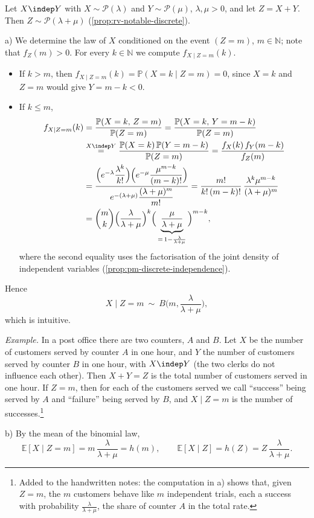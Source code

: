 \begin{example}\label{exa:ce-poisson}
Let $X\indep Y$ with $X\sim\mathcal P(\lambda)$ and $Y\sim\mathcal P(\mu)$, $\lambda,\mu>0$, and
let $Z=X+Y$. Then $Z\sim\mathcal P(\lambda+\mu)$ (\cref{prop:rv-notable-discrete}).

a) We determine the law of $X$ conditioned on the event $(Z=m)$, $m\in\mathbb N$; note that
$f_Z(m)>0$. For every $k\in\mathbb N$ we compute $f_{X\mid Z=m}(k)$.
\begin{itemize}
  \item If $k>m$, then $f_{X\mid Z=m}(k)=\mathbb P(X=k\mid Z=m)=0$, since $X=k$ and $Z=m$ would
    give $Y=m-k<0$.
  \item If $k\le m$,
    \[
    \begin{aligned}
      f_{X\mid Z=m}(k)&=\frac{\mathbb P(X=k,\,Z=m)}{\mathbb P(Z=m)}=\frac{\mathbb P(X=k,\,Y=m-k)}{\mathbb P(Z=m)}\\
      &\overset{X\indep Y}{=}\frac{\mathbb P(X=k)\,\mathbb P(Y=m-k)}{\mathbb P(Z=m)}
      =\frac{f_X(k)\,f_Y(m-k)}{f_Z(m)}\\
      &=\frac{\Big(e^{-\lambda}\dfrac{\lambda^k}{k!}\Big)\Big(e^{-\mu}\dfrac{\mu^{m-k}}{(m-k)!}\Big)}
        {e^{-(\lambda+\mu)}\dfrac{(\lambda+\mu)^m}{m!}}
      =\frac{m!}{k!\,(m-k)!}\,\frac{\lambda^k\mu^{m-k}}{(\lambda+\mu)^m}\\
      &=\binom mk\Big(\frac\lambda{\lambda+\mu}\Big)^k\Big(\underbrace{\frac\mu{\lambda+\mu}}_{=\,1-\frac\lambda{\lambda+\mu}}\Big)^{m-k},
    \end{aligned}
    \]
    where the second equality uses the factorisation of the joint density of independent
    variables (\cref{prop:pm-discrete-independence}).
\end{itemize}
Hence
\[
  X\mid Z=m\ \sim\ B\Big(m,\frac\lambda{\lambda+\mu}\Big),
\]
which is intuitive.

\emph{Example.} In a post office there are two counters, $A$ and $B$. Let $X$ be the number of
customers served by counter $A$ in one hour, and $Y$ the number of customers served by counter
$B$ in one hour, with $X\indep Y$ (the two clerks do not influence each other). Then $X+Y=Z$ is
the total number of customers served in one hour. If $Z=m$, then for each of the customers
served we call ``success'' being served by $A$ and ``failure'' being served by $B$, and
$X\mid Z=m$ is the number of successes.\footnote{Added to the handwritten notes: the computation
in a) shows that, given $Z=m$, the $m$ customers behave like $m$ independent trials, each a
success with probability $\frac\lambda{\lambda+\mu}$, the share of counter $A$ in the total
rate.}

b) By the mean of the binomial law,
\[
  \mathbb E[X\mid Z=m]=m\,\frac\lambda{\lambda+\mu}=h(m),\qquad
  \mathbb E[X\mid Z]=h(Z)=Z\,\frac\lambda{\lambda+\mu}.
\]
\end{example}

